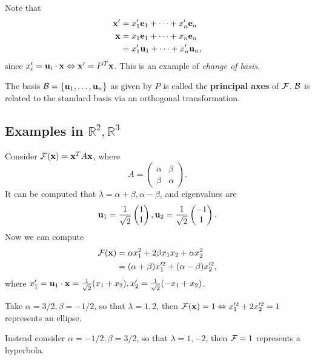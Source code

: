 \documentclass[10pt]{article}
\begin{document}
    Note that 
    \begin{align*}
        {\bf x}'&= x_1'{\bf e}_1+\cdots+x_n'{\bf e}_n\\
        {\bf x}&= x_1{\bf e}_1+ \cdots + x_n{\bf e}_n\\
        &= x_1'{\bf u}_1+\cdots +x_n'{\bf u}_n,
    \end{align*}
    since $x_i' = {\bf u}_i\cdot {\bf x} \Leftrightarrow {\bf x}'=P^T{\bf x}$. This is an example of \textit{change of basis}.
    \begin{definition}
        The basis $ {\mathcal{B}} = \{{\bf u}_1,\dots,{\bf u}_n\} $ as given by $P$ is called the \textbf{principal axes} of ${\mathcal{F}}$. ${\mathcal{B}}$ is related to the standard basis via an orthogonal transformation.
    \end{definition}
    \subsection{Examples in $ \mathbb{R}^{2},\mathbb{R}^{3} $}
    \begin{example}[$ \mathbb{R}^{2} $]
        Consider $ {\mathcal{F}}({\bf x})={\bf x}^TA{\bf x} $, where 
        \[
            A=\begin{pmatrix}
                \alpha&\beta\\
                \beta&\alpha
            \end{pmatrix}.
        \]
        It can be computed that $ \lambda = \alpha+\beta,\alpha-\beta $, and eigenvalues are
        \[
            {\bf u}_1 = \frac{1}{\sqrt{2}}\begin{pmatrix}
                1\\1
            \end{pmatrix}, {\bf u}_2 = \frac{1}{\sqrt{2}}\begin{pmatrix}
                -1\\1
            \end{pmatrix}.
        \]
        Now we can compute 
        \begin{align*}
            {\mathcal{F}}({\bf x})&= \alpha x_1^2+2\beta x_1x_2+\alpha x_2^2\\
            &= (\alpha+\beta)x_1'^2+(\alpha-\beta)x_2'^2,
        \end{align*}
        where $ x_1' = {\bf u}_1 \cdot {\bf x} = \frac{1}{\sqrt{2}}(x_1+x_2), x_2'= \frac{1}{\sqrt{2}}(-x_1+x_2)$.

        Take $ \alpha=3/2,\beta=-1/2 $, so that $ \lambda=1,2 $, then $ {\mathcal{F}}({\bf x})=1 \Leftrightarrow x_1'^2+2x_2'^2=1 $ represents an ellipse.

        Instead consider $ \alpha=-1/2, \beta=3/2 $, so that $ \lambda=1,-2 $, then $ {\mathcal{F}}=1 $ represents a hyperbola.
    \end{example}
\end{document}
